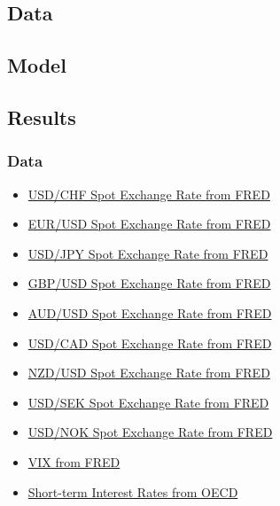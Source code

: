 \documentclass[11pt,]{beamer}
\begin{document}
\subsection{Data}
\subsection{Model}
\subsection{Results}
\begin{frame}[t]
	\frametitle{Data}
 \begin{itemize}
 \item \href{https://fred.stlouisfed.org/graph/?g=1cwRm}{USD/CHF Spot Exchange Rate from FRED} 
 \item \href{https://fred.stlouisfed.org/graph/?g=1cwLK}{EUR/USD Spot Exchange Rate from FRED}
 \item \href{https://fred.stlouisfed.org/graph/?g=1cwNJ}{USD/JPY Spot Exchange Rate from FRED}
 \item \href{https://fred.stlouisfed.org/graph/?g=1cwOd}{GBP/USD Spot Exchange Rate from FRED}
 \item \href{https://fred.stlouisfed.org/graph/?g=1cwOA}{AUD/USD Spot Exchange Rate from FRED}
 \item \href{https://fred.stlouisfed.org/graph/?g=1cwOW}{USD/CAD Spot Exchange Rate from FRED}
 \item \href{https://fred.stlouisfed.org/graph/?g=1cwPf}{NZD/USD Spot Exchange Rate from FRED}
 \item \href{https://fred.stlouisfed.org/graph/?g=1cwPD}{USD/SEK Spot Exchange Rate from FRED}
 \item \href{https://fred.stlouisfed.org/graph/?g=1cwPN}{USD/NOK Spot Exchange Rate from FRED}
 \item \href{https://fred.stlouisfed.org/graph/?g=1cwPY}{VIX from FRED}
 \item \href{https://data.oecd.org/chart/7hSF}{Short-term Interest Rates from OECD}
 \end{itemize}
\end{frame} 
\end{document}
